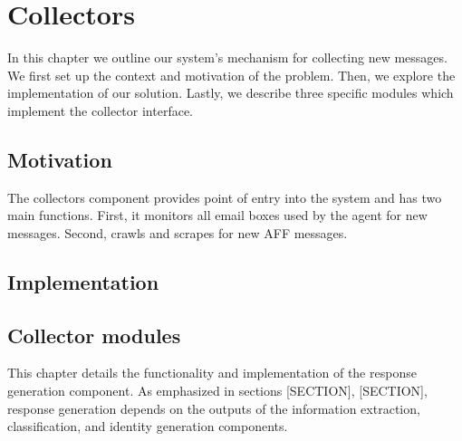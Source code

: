 \chapter{Collectors}

In this chapter we outline our system's mechanism for collecting new messages. We first set up the context and motivation of the problem. Then, we explore the implementation of our solution. Lastly, we describe three specific modules which implement the collector interface.

\section{Motivation}


The collectors component provides point of entry into the system and has two main functions. First, it monitors all email boxes used by the agent for new messages. Second, crawls and scrapes for new AFF messages.



\section{Implementation}
\section{Collector modules}


This chapter details the functionality and implementation of the response generation component. As emphasized in sections [SECTION], [SECTION], response generation depends on the outputs of the information extraction, classification, and identity generation components. 

